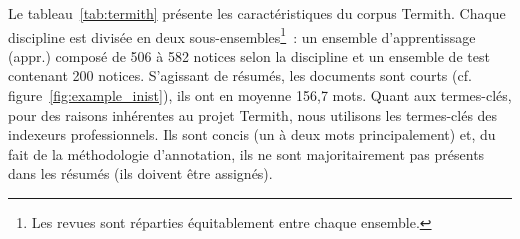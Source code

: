     \begin{table}
      \centering

      \caption{Détail des revues du corpus de chimie (Termith)
               \label{tab:chemestry_journals}}
    \end{table}

    Le tableau~\ref{tab:termith} présente les caractéristiques du corpus
    Termith. Chaque discipline est divisée en deux sous-ensembles\footnote{Les
    revues sont réparties équitablement entre chaque ensemble.}~: un ensemble
    d'apprentissage (appr.) composé de 506 à 582 notices selon la discipline et
    un ensemble de test contenant 200 notices. S'agissant de résumés, les
    documents sont courts (cf. figure~\ref{fig:example_inist}), ils ont en
    moyenne 156,7 mots. Quant aux termes-clés, pour des raisons inhérentes au
    projet Termith, nous utilisons les termes-clés des indexeurs professionnels.
    Ils sont concis (un à deux mots principalement) et, du fait de la
    méthodologie d'annotation, ils ne sont majoritairement pas présents dans les
    résumés (ils doivent être assignés).

